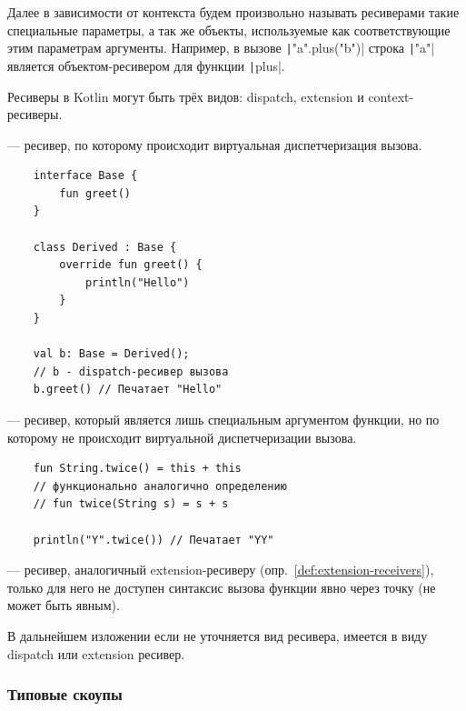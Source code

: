 Далее в зависимости от контекста будем произвольно называть ресиверами такие специальные параметры, а так же объекты, используемые как соответствующие этим параметрам аргументы.
Например, в вызове \texttt|"a".plus("b")| строка \texttt|"a"| является объектом-ресивером для функции \texttt|plus|.

Ресиверы в Kotlin могут быть трёх видов: dispatch, extension и context-ресиверы.

\begin{definition}
    \label{def:dispatch-receivers}
     --- ресивер, по которому происходит виртуальная диспетчеризация вызова.
\end{definition}

\begin{verbatim}
    interface Base {
        fun greet()
    }

    class Derived : Base {
        override fun greet() {
            println("Hello")
        }
    }

    val b: Base = Derived();
    // b - dispatch-ресивер вызова
    b.greet() // Печатает "Hello"
\end{verbatim}

\begin{definition}
    \label{def:extension-receivers}
     --- ресивер, который является лишь специальным аргументом функции, но по которому не происходит виртуальной диспетчеризации вызова.
\end{definition}

\begin{verbatim}
    fun String.twice() = this + this
    // функционально аналогично определению
    // fun twice(String s) = s + s

    println("Y".twice()) // Печатает "YY"
\end{verbatim}

\begin{definition}
    \label{def:context-receivers}
     --- ресивер, аналогичный extension-ресиверу (опр.~\ref{def:extension-receivers}), только для него не доступен синтаксис вызова функции явно через точку (не может быть явным).
\end{definition}

В дальнейшем изложении если не уточняется вид ресивера, имеется в виду dispatch или extension ресивер.

\subsubsection{Типовые скоупы}

